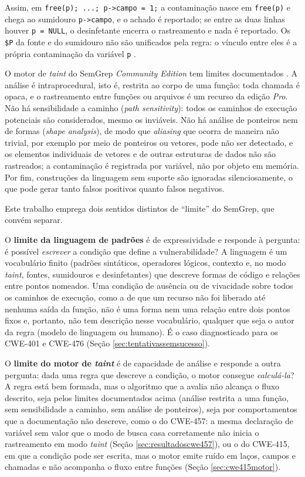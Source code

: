 \documentclass[
    12pt,                %
    openright,           %
    oneside,             %
    a4paper,             %
    english,             %
    brazil               %
]{abntex2}
\newcommand{\novo}[1]{{\color{red}#1}}
\begin{document}
\par
\novo{Assim, em \texttt{free(p); ...; p->campo = 1;} a contaminação nasce em \texttt{free(p)} e chega ao sumidouro \texttt{p->campo}, e o achado é reportado; se entre as duas linhas houver \texttt{p = NULL}, o desinfetante encerra o rastreamento e nada é reportado. Os \texttt{\$P} da fonte e do sumidouro não são unificados pela regra: o vínculo entre eles é a própria contaminação da variável \texttt{p} \cite{semgrep2026taintavancado}.}
\par
\novo{O motor de \textit{taint} do SemGrep \textit{Community Edition} tem limites documentados \cite{semgrep2026dataflow, semgrep2026taintavancado}. A análise é intraprocedural, isto é, restrita ao corpo de uma função: toda chamada é opaca, e o rastreamento entre funções ou arquivos é um recurso da edição \textit{Pro}. Não há sensibilidade a caminho (\textit{path sensitivity}): todos os caminhos de execução potenciais são considerados, mesmo os inviáveis. Não há análise de ponteiros nem de formas (\textit{shape analysis}), de modo que \textit{aliasing} que ocorra de maneira não trivial, por exemplo por meio de ponteiros ou vetores, pode não ser detectado, e os elementos individuais de vetores e de outras estruturas de dados não são rastreados; a contaminação é registrada por variável, não por objeto em memória. Por fim, construções da linguagem sem suporte são ignoradas silenciosamente, o que pode gerar tanto falsos positivos quanto falsos negativos.}
\par
\novo{Este trabalho emprega dois sentidos distintos de ``limite'' do SemGrep, que convém separar.}
\par
\novo{O \textbf{limite da linguagem de padrões} é de expressividade e responde à pergunta: é possível \textit{escrever} a condição que define a vulnerabilidade? A linguagem é um vocabulário finito (padrões sintáticos, operadores lógicos, contexto e, no modo \textit{taint}, fontes, sumidouros e desinfetantes) que descreve formas de código e relações entre pontos nomeados. Uma condição de ausência ou de vivacidade sobre todos os caminhos de execução, como a de que um recurso não foi liberado até nenhuma saída da função, não é uma forma nem uma relação entre dois pontos fixos e, portanto, não tem descrição nesse vocabulário, qualquer que seja o autor da regra (modelo de linguagem ou humano). É o caso diagnosticado para os CWE-401 e CWE-476 (Seção \ref{sec:tentativassemsucesso}).}
\par
\novo{O \textbf{limite do motor de \textit{taint}} é de capacidade de análise e responde a outra pergunta: dada uma regra que descreve a condição, o motor consegue \textit{calculá-la}? A regra está bem formada, mas o algoritmo que a avalia não alcança o fluxo descrito, seja pelos limites documentados acima (análise restrita a uma função, sem sensibilidade a caminho, sem análise de ponteiros), seja por comportamentos que a documentação não descreve, como o do CWE-457: a mesma declaração de variável sem valor que o modo de busca casa corretamente não inicia o rastreamento em modo \textit{taint} (Seção \ref{sec:resultadoscwe457}), ou o do CWE-415, em que a condição pode ser escrita, mas o motor emite ruído em laços, campos e chamadas e não acompanha o fluxo entre funções (Seção \ref{sec:cwe415motor}).}
\end{document}
